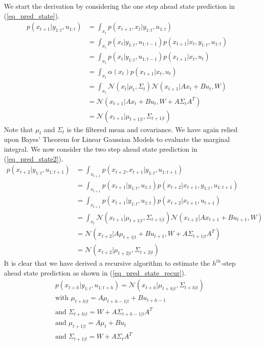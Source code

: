 We start the derivation by considering the one step ahead state prediction in (\ref{eq_pred_state}).
\begin{equation}
\begin{aligned}
p(x_{t+1}|y_{1:t}, u_{1:t}) &= \int_{x_t} p(x_{t+1},x_t|y_{1:t}, u_{1:t}) \\
&= \int_{x_t} p(x_t|y_{1:t}, u_{1:t-1}) p(x_{t+1}|x_t,y_{1:t}, u_{1:t}) \\
&= \int_{x_t} p(x_t|y_{1:t}, u_{1:t-1}) p(x_{t+1}|x_t, u_{t}) \\
&= \int_{x_t} \alpha(x_t) p(x_{t+1}|x_t, u_{t}) \\
&= \int_{x_t} \mathcal{N}(x_t|\mu_t, \Sigma_t) \mathcal{N}(x_{t+1}|Ax_t+Bu_t, W) \\
&= \mathcal{N}(x_{t+1}|Ax_t+Bu_t, W+A\Sigma_t A^T) \\
&= \mathcal{N}(x_{t+1}|\mu_{t+1|t}, \Sigma_{t+1|t})
\end{aligned}
\label{eq_pred_state}
\end{equation}
Note that $\mu_t$ and $\Sigma_t$ is the filtered mean and covariance. We have again relied upon Bayes' Theorem for Linear Gaussian Models to evaluate the marginal integral. We now consider the two step ahead state prediction in (\ref{eq_pred_state2}).
\begin{equation}
\begin{aligned}
p(x_{t+2}|y_{1:t}, u_{1:t+1}) &= \int_{x_{t+1}} p(x_{t+2},x_{t+1}|y_{1:t}, u_{1:t+1}) \\
&= \int_{x_{t+1}} p(x_{t+1}|y_{1:t}, u_{1:t}) p(x_{t+2}|x_{t+1},y_{1:t}, u_{1:t+1}) \\
&= \int_{x_{t+1}} p(x_{t+1}|y_{1:t}, u_{1:t}) p(x_{t+2}|x_{t+1}, u_{t+1}) \\
&= \int_{x_t} \mathcal{N}(x_{t+1}|\mu_{t+1|t}, \Sigma_{t+1|t})\mathcal{N}(x_{t+2}|Ax_{t+1}+Bu_{t+1}, W) \\
&= \mathcal{N}(x_{t+2}|A\mu_{t+1|t}+Bu_{t+1}, W+A\Sigma_{t+1|t} A^T) \\
&= \mathcal{N}(x_{t+2}|\mu_{t+2|t}, \Sigma_{t+2|t})
\end{aligned}
\label{eq_pred_state2}
\end{equation}
It is clear that we have derived a recursive algorithm to estimate the $h^{th}$-step ahead state prediction as shown in (\ref{eq_pred_state_recur}).
\begin{equation}
\begin{aligned}
&p(x_{t+h}|y_{1:t}, u_{1:t+h}) = \mathcal{N}(x_{t+h}|\mu_{t+h|t}, \Sigma_{t+h|t}) \\
&\text{with } \mu_{t+h|t} = A\mu_{t+h-1|t}+Bu_{t+h-1} \\
&\text{and } \Sigma_{t+h|t} = W+A\Sigma_{t+h-1|t} A^T \\
&\text{and } \mu_{t+1|t} = A\mu_t+Bu_{t} \\
&\text{and } \Sigma_{t+1|t} = W+A\Sigma_t A^T \\ 
\end{aligned}
\label{eq_pred_state_recur}
\end{equation}
